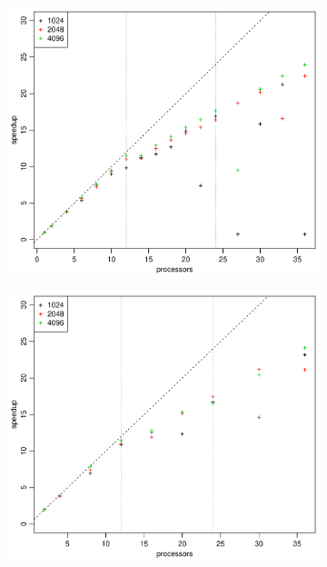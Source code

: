 \begin{figure}[h!]
  \centering
  \begin{subfigure}[b]{0.48\textwidth}
    \includegraphics[width=\textwidth]{./Figures/taskbSpeedupProc1.pdf}
  \end{subfigure}%
  \quad
  \begin{subfigure}[b]{0.48\textwidth}
    \includegraphics[width=\textwidth]{./Figures/taskbSpeedupProc2.pdf}
  \end{subfigure}

\end{figure}

